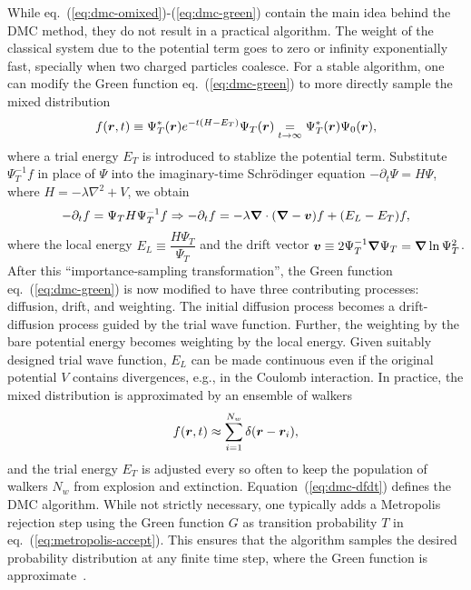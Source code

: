 While eq.~(\ref{eq:dmc-omixed})-(\ref{eq:dmc-green}) contain the main idea behind the DMC method, they do not result in a practical algorithm. The weight of the classical system due to the potential term goes to zero or infinity exponentially fast, specially when two charged particles coalesce. For a stable algorithm, one can modify the Green function eq.~(\ref{eq:dmc-green}) to more directly sample the mixed distribution
\begin{align}
f(\boldsymbol{r},t) \equiv \Psi_T^*(\boldsymbol{r}) e^{-t(H-E_T)}\Psi_T(\boldsymbol{r}) \underset{t\rightarrow\infty}{=} \Psi_T^*(\boldsymbol{r})\Psi_0(\boldsymbol{r}),
\end{align}
where a trial energy $E_T$ is introduced to stablize the potential term.
Substitute $\Psi_T^{-1}f$ in place of $\Psi$ into the imaginary-time Schr\"odinger equation $-\partial_t \Psi = H\Psi$, where $H=-\lambda\nabla^2+V$, we obtain
\begin{align} \label{eq:dmc-dfdt}
-\partial_t f = \Psi_T H \Psi_T^{-1} f \Rightarrow -\partial_t f=-\lambda\boldsymbol{\nabla}\cdot(\boldsymbol{\nabla}-\boldsymbol{v})f+(E_L-E_T)f,
\end{align}
where the local energy $E_L\equiv \dfrac{H\Psi_T}{\Psi_T}$ and the drift vector $\boldsymbol{v}\equiv2\Psi_T^{-1}\boldsymbol{\nabla}\Psi_T=\boldsymbol{\nabla}\ln\Psi_T^2$.
After this ``importance-sampling transformation'', the Green function eq.~(\ref{eq:dmc-green}) is now modified to have three contributing processes: diffusion, drift, and weighting. The initial diffusion process becomes a drift-diffusion process guided by the trial wave function. Further, the weighting by the bare potential energy becomes weighting by the local energy. Given suitably designed trial wave function, $E_L$ can be made continuous even if the original potential $V$ contains divergences, e.g., in the Coulomb interaction.
In practice, the mixed distribution is approximated by an ensemble of walkers
\begin{align}
f(\boldsymbol{r},t) \approx \sum\limits_{i=1}^{N_w} \delta(\boldsymbol{r}-\boldsymbol{r}_i),
\end{align}
and the trial energy $E_T$ is adjusted every so often to keep the population of walkers $N_w$ from explosion and extinction. Equation~(\ref{eq:dmc-dfdt}) defines the DMC algorithm.
While not strictly necessary, one typically adds a Metropolis rejection step using the Green function $G$ as transition probability $T$ in eq.~(\ref{eq:metropolis-accept}). This ensures that the algorithm samples the desired probability distribution at any finite time step, where the Green function is approximate~\cite{Reynolds1982}.

